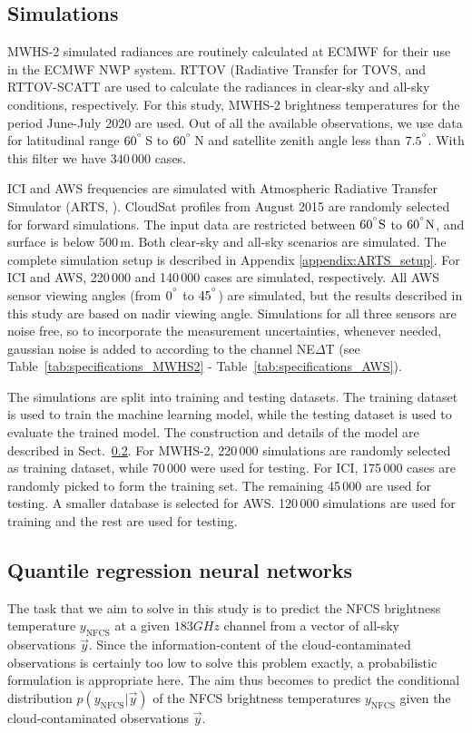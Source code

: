\documentclass[amt, manuscript]{copernicus}
\newcommand{\todo}[1]{{\color{red} #1}}
\newcommand{\ynfcs}{y_\text{NFCS}}
\newcommand{\y}{\vec{y}}
\begin{document}
\subsection{Simulations}
%
MWHS-2 simulated radiances are routinely calculated at ECMWF for their use in the ECMWF NWP system. RTTOV (Radiative Transfer for TOVS, \citet{saunders2018update} and RTTOV-SCATT \citep{bauer2006rttovscat} are used to calculate the radiances in clear-sky and all-sky conditions, respectively. For this study, MWHS-2 brightness temperatures for the period June-July 2020 are used. Out of all the available observations, we use data for latitudinal range $60^{^{\circ}}$\,S to $60^{^{\circ}}$\,N and satellite zenith angle less than $7.5^{^{\circ}}$. With this filter we have 340\,000 cases.

ICI and AWS frequencies are simulated with Atmospheric Radiative Transfer Simulator (ARTS, \citet{buehler:artst:18}). CloudSat\citep{Stephens2002cloudsat} profiles from August 2015 are randomly selected for forward simulations. The input data are restricted between $60\unit{^{\degree}S}$ to $60\unit{^{\degree}N}$, and surface is below 500\,m. Both clear-sky and all-sky scenarios  are simulated. The complete simulation setup is described in Appendix \ref{appendix:ARTS_setup}. For ICI and AWS, 220\,000 and 140\,000 cases are simulated, respectively. All AWS sensor viewing angles (from $0^{^{\circ}}$ to $45^{^{\circ}}$) are simulated, but the results described in this study are based on nadir viewing angle. Simulations for all three sensors are noise free, so to incorporate the measurement uncertainties, whenever needed, gaussian noise is added to according to the channel NE$\Delta$T (see Table~\ref{tab:specifications_MWHS2} - Table~\ref{tab:specifications_AWS}). 

The simulations are split into training and testing datasets. The training dataset is used to train the machine learning model, while the testing dataset is used to evaluate the trained model. The construction and details of the model are described in Sect.~\ref{sec:QRNN}. For MWHS-2, 220\,000 simulations are randomly selected as training dataset, while 70\,000 were used for testing. For ICI, 175\,000 cases are randomly picked to form the training set. The remaining 45\,000 are used for testing. A smaller database is selected for AWS. 120\,000 simulations are used for training and the rest are used for testing.

\subsection{Quantile regression neural networks}
\label{sec:QRNN}
%
The task that we aim to solve in this study is to predict the NFCS brightness
temperature \todo{$\ynfcs$} at a given $183\unit{GHz}$ channel from a vector of
all-sky observations $\y$. Since the information-content of the
cloud-contaminated observations is certainly too low to solve this problem
exactly, a probabilistic formulation is appropriate here. The aim thus becomes
to predict the conditional distribution $p(\ynfcs | \y)$ of the NFCS brightness
temperatures $\ynfcs$ given the cloud-contaminated observations $\y$.
\end{document}
